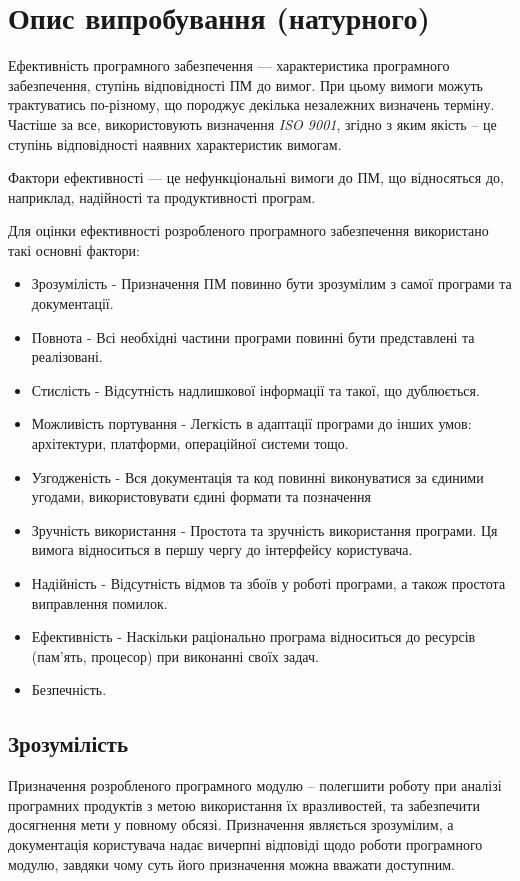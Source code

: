 \section{Опис випробування (натурного)}
\label{4section:id2}

Ефективність програмного забезпечення — характеристика програмного забезпечення, ступінь відповідності ПМ до вимог. При цьому вимоги можуть трактуватись по-різному, що породжує декілька незалежних визначень терміну. Частіше за все, використовують визначення {\it ISO 9001}, згідно з яким якість – це \dq ступінь відповідності наявних характеристик вимогам\dq.

Фактори ефективності  — це нефункціональні вимоги до ПМ, що відносяться до, наприклад, надійності та продуктивності програм.

Для оцінки ефективності розробленого програмного забезпечення використано такі основні фактори:
\begin{itemize}
\item Зрозумілість - Призначення ПМ повинно бути зрозумілим з самої програми та документації.
\item Повнота - Всі необхідні частини програми повинні бути представлені та реалізовані.
\item Стислість - Відсутність надлишкової інформації та такої, що дублюється.
\item Можливість портування - Легкість в адаптації програми до інших умов: архітектури, платформи, операційної системи тощо.
\item Узгодженість - Вся документація та код повинні виконуватися за єдиними угодами, використовувати єдині формати та позначення
\item Зручність використання - Простота та зручність використання програми. Ця вимога відноситься в першу чергу до інтерфейсу користувача.
\item Надійність - Відсутність відмов та збоїв у роботі програми, а також простота виправлення помилок.
\item Ефективність - Наскільки раціонально програма відноситься до ресурсів (пам’ять, процесор) при виконанні своїх задач.
\item Безпечність.
\end{itemize}

\subsection{Зрозумілість}\label{mark_understand}
Призначення розробленого програмного модулю – полегшити роботу при аналізі програмних продуктів з метою використання їх вразливостей, та забезпечити досягнення мети у повному обсязі. Призначення являється зрозумілим, а документація користувача надає вичерпні відповіді щодо роботи програмного модулю, завдяки чому суть його призначення можна вважати доступним.

